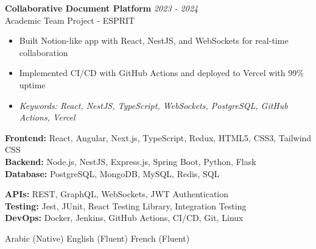 \documentclass[11pt,a4paper]{article}
\begin{document}

\textbf{Collaborative Document Platform} \hfill \textit{2023 - 2024}\\[-2pt]
Academic Team Project - ESPRIT\\[-5pt]
\begin{itemize}[leftmargin=8pt,itemsep=1pt,topsep=2pt]
  \item Built Notion-like app with React, NestJS, and WebSockets for real-time collaboration
  \item Implemented CI/CD with GitHub Actions and deployed to Vercel with 99\% uptime
  \item[] \textit{\footnotesize Keywords: React, NestJS, TypeScript, WebSockets, PostgreSQL, GitHub Actions, Vercel}
\end{itemize}\vspace{3pt}

{\small
\begin{minipage}[t]{0.48\textwidth}
  \textbf{Frontend:} React, Angular, Next.js, TypeScript, Redux, HTML5, CSS3, Tailwind CSS\\[1.5pt]
  \textbf{Backend:} Node.js, NestJS, Express.js, Spring Boot, Python, Flask\\[1.5pt]
  \textbf{Database:} PostgreSQL, MongoDB, MySQL, Redis, SQL
\end{minipage}
\hfill
\begin{minipage}[t]{0.48\textwidth}
  \textbf{APIs:} REST, GraphQL, WebSockets, JWT Authentication\\[1.5pt]
  \textbf{Testing:} Jest, JUnit, React Testing Library, Integration Testing\\[1.5pt]
  \textbf{DevOps:} Docker, Jenkins, GitHub Actions, CI/CD, Git, Linux
\end{minipage}
}

Arabic (Native) \textbar{} English (Fluent) \textbar{} French (Fluent)
\end{document}

